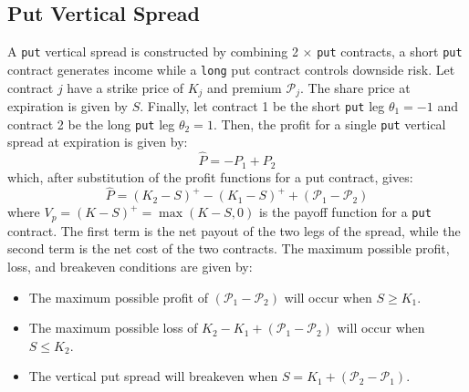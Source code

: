 \documentclass[11pt]{article}
\theoremstyle{definition}
\begin{document}
\subsection*{Put Vertical Spread}
A \texttt{put} vertical spread is constructed by combining 2 $\times$ \texttt{put} contracts, 
a short \texttt{put} contract generates income while a \texttt{long} put contract controls downside risk.  
Let contract $j$ have a strike price of $K_{j}$ and premium $\mathcal{P}_{j}$. 
The share price at expiration is given by $S$. 
Finally, let contract 1 be the short \texttt{put} leg $\theta_{1} = -1$ and contract 2 be the long \texttt{put} leg $\theta_{2} = 1$. 
Then, the profit for a single \texttt{put} vertical spread at expiration is given by:
\begin{equation}
\hat{P} = -P_{1}+P_{2}
\end{equation}
which, after substitution of the profit functions for a put contract, gives:
\begin{equation}
\hat{P} = \left(K_{2} - S\right)^{+} - \left(K_{1} - S\right)^{+} + \left(\mathcal{P}_{1} - \mathcal{P}_{2}\right)
\end{equation}
where $V_{p} = (K-S)^{+}=\max(K-S,0)$ is the payoff function for a \texttt{put} contract. 
The first term is the net payout of the two legs of the spread, while the second term is the net cost of the two contracts. 
The maximum possible profit, loss, and breakeven conditions are given by:
\begin{itemize}
\item{The maximum possible profit of $\left(\mathcal{P}_{1} - \mathcal{P}_{2}\right)$ will occur when $S\geq{K_{1}}$.}
\item{The maximum possible loss of $K_{2} - K_{1} + \left(\mathcal{P}_{1} - \mathcal{P}_{2}\right)$ will occur when $S\leq{K_{2}}$.}
\item{The vertical put spread will breakeven when $S =  K_{1}+\left(\mathcal{P}_{2} - \mathcal{P}_{1}\right)$.}
\end{itemize}
\end{document}
